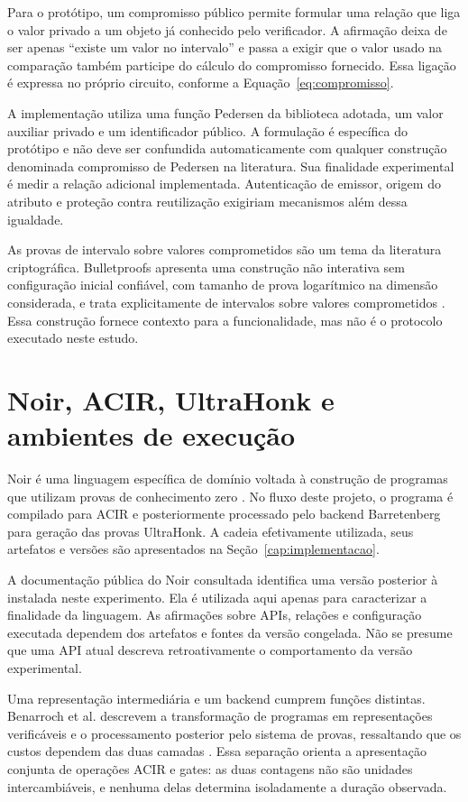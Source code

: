 Para o protótipo, um compromisso público permite formular uma relação que liga o valor privado a um objeto já conhecido pelo verificador. A afirmação deixa de ser apenas ``existe um valor no intervalo'' e passa a exigir que o valor usado na comparação também participe do cálculo do compromisso fornecido. Essa ligação é expressa no próprio circuito, conforme a Equação~\ref{eq:compromisso}.

A implementação utiliza uma função Pedersen da biblioteca adotada, um valor auxiliar privado e um identificador público. A formulação é específica do protótipo e não deve ser confundida automaticamente com qualquer construção denominada compromisso de Pedersen na literatura. Sua finalidade experimental é medir a relação adicional implementada. Autenticação de emissor, origem do atributo e proteção contra reutilização exigiriam mecanismos além dessa igualdade.

As provas de intervalo sobre valores comprometidos são um tema da literatura criptográfica. Bulletproofs apresenta uma construção não interativa sem configuração inicial confiável, com tamanho de prova logarítmico na dimensão considerada, e trata explicitamente de intervalos sobre valores comprometidos \cite{bulletproofs}. Essa construção fornece contexto para a funcionalidade, mas não é o protocolo executado neste estudo.

\section{Noir, ACIR, UltraHonk e ambientes de execução}

Noir é uma linguagem específica de domínio voltada à construção de programas que utilizam provas de conhecimento zero \cite{noirdocs}. No fluxo deste projeto, o programa é compilado para ACIR e posteriormente processado pelo backend Barretenberg para geração das provas UltraHonk. A cadeia efetivamente utilizada, seus artefatos e versões são apresentados na Seção~\ref{cap:implementacao}.

A documentação pública do Noir consultada identifica uma versão posterior à instalada neste experimento. Ela é utilizada aqui apenas para caracterizar a finalidade da linguagem. As afirmações sobre APIs, relações e configuração executada dependem dos artefatos e fontes da versão congelada. Não se presume que uma API atual descreva retroativamente o comportamento da versão experimental.

Uma representação intermediária e um backend cumprem funções distintas. Benarroch et al. descrevem a transformação de programas em representações verificáveis e o processamento posterior pelo sistema de provas, ressaltando que os custos dependem das duas camadas \cite{zkbenchmark}. Essa separação orienta a apresentação conjunta de operações ACIR e gates: as duas contagens não são unidades intercambiáveis, e nenhuma delas determina isoladamente a duração observada.


